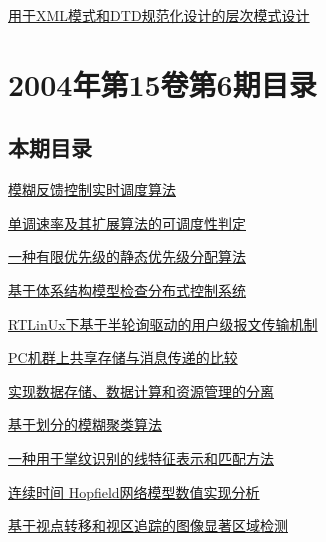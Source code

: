 \documentclass[a4paper]{article}
\begin{document}
\href{http://www.jos.org.cn/ch/reader/download_pdf.aspx?file_no=20040718&year_id=2004&quarter_id=7&falg=1}{用于XML模式和DTD规范化设计的层次模式设计}


\section{\textbf{2004年第15卷第6期目录}}
\subsection{本期目录}
\href{http://www.jos.org.cn/ch/reader/download_pdf.aspx?file_no=20040601&year_id=2004&quarter_id=6&falg=1}{模糊反馈控制实时调度算法}

\href{http://www.jos.org.cn/ch/reader/download_pdf.aspx?file_no=20040602&year_id=2004&quarter_id=6&falg=1}{单调速率及其扩展算法的可调度性判定}

\href{http://www.jos.org.cn/ch/reader/download_pdf.aspx?file_no=20040603&year_id=2004&quarter_id=6&falg=1}{一种有限优先级的静态优先级分配算法}

\href{http://www.jos.org.cn/ch/reader/download_pdf.aspx?file_no=20040604&year_id=2004&quarter_id=6&falg=1}{基于体系结构模型检查分布式控制系统}

\href{http://www.jos.org.cn/ch/reader/download_pdf.aspx?file_no=20040605&year_id=2004&quarter_id=6&falg=1}{RTLinUx下基于半轮询驱动的用户级报文传输机制}

\href{http://www.jos.org.cn/ch/reader/download_pdf.aspx?file_no=20040606&year_id=2004&quarter_id=6&falg=1}{PC机群上共享存储与消息传递的比较}

\href{http://www.jos.org.cn/ch/reader/download_pdf.aspx?file_no=20040607&year_id=2004&quarter_id=6&falg=1}{实现数据存储、数据计算和资源管理的分离}

\href{http://www.jos.org.cn/ch/reader/download_pdf.aspx?file_no=20040608&year_id=2004&quarter_id=6&falg=1}{基于划分的模糊聚类算法}

\href{http://www.jos.org.cn/ch/reader/download_pdf.aspx?file_no=20040609&year_id=2004&quarter_id=6&falg=1}{一种用于掌纹识别的线特征表示和匹配方法}

\href{http://www.jos.org.cn/ch/reader/download_pdf.aspx?file_no=20040610&year_id=2004&quarter_id=6&falg=1}{连续时间 Hopfield网络模型数值实现分析}

\href{http://www.jos.org.cn/ch/reader/download_pdf.aspx?file_no=20040611&year_id=2004&quarter_id=6&falg=1}{基于视点转移和视区追踪的图像显著区域检测}
\end{document}

